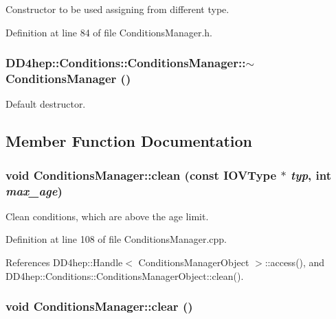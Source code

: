Constructor to be used assigning from different type. 

Definition at line 84 of file ConditionsManager.h.\hypertarget{class_d_d4hep_1_1_conditions_1_1_conditions_manager_ab16fe390c87fa0c67f984425be46c9ca}{
\subsubsection[{$\sim$ConditionsManager}]{\setlength{\rightskip}{0pt plus 5cm}DD4hep::Conditions::ConditionsManager::$\sim$ConditionsManager ()}}
\label{class_d_d4hep_1_1_conditions_1_1_conditions_manager_ab16fe390c87fa0c67f984425be46c9ca}


Default destructor. 

\subsection{Member Function Documentation}
\hypertarget{class_d_d4hep_1_1_conditions_1_1_conditions_manager_a0a737c0144c439c5fc5cc8c11fc6e909}{
\subsubsection[{clean}]{\setlength{\rightskip}{0pt plus 5cm}void ConditionsManager::clean (const {\bf IOVType} $\ast$ {\em typ}, \/  int {\em max\_\-age})}}
\label{class_d_d4hep_1_1_conditions_1_1_conditions_manager_a0a737c0144c439c5fc5cc8c11fc6e909}


Clean conditions, which are above the age limit. 

Definition at line 108 of file ConditionsManager.cpp.

References DD4hep::Handle$<$ ConditionsManagerObject $>$::access(), and DD4hep::Conditions::ConditionsManagerObject::clean().\hypertarget{class_d_d4hep_1_1_conditions_1_1_conditions_manager_af1a5f51d3f887ebee75eb32094d1ee3f}{
\subsubsection[{clear}]{\setlength{\rightskip}{0pt plus 5cm}void ConditionsManager::clear ()}}
\label{class_d_d4hep_1_1_conditions_1_1_conditions_manager_af1a5f51d3f887ebee75eb32094d1ee3f}


